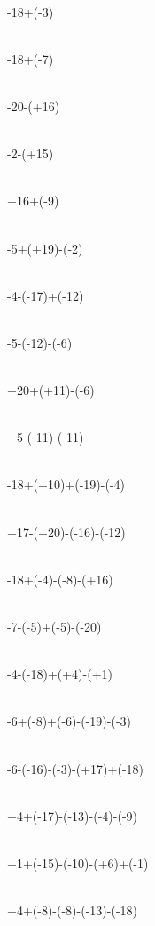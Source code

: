 
\begin{multicols}{4}
\\ 
-18+(-3)

\\ 
-18+(-7)

\\ 
-20-(+16)

\\ 
-2-(+15)

\\ 
+16+(-9)

\\ 
-5+(+19)-(-2)

\\ 
-4-(-17)+(-12)

\\ 
-5-(-12)-(-6)

\\ 
+20+(+11)-(-6)

\\ 
+5-(-11)-(-11)

\\ 
-18+(+10)+(-19)-(-4)

\\ 
+17-(+20)-(-16)-(-12)

\\ 
-18+(-4)-(-8)-(+16)

\\ 
-7-(-5)+(-5)-(-20)

\\ 
-4-(-18)+(+4)-(+1)

\\ 
-6+(-8)+(-6)-(-19)-(-3)

\\ 
-6-(-16)-(-3)-(+17)+(-18)

\\ 
+4+(-17)-(-13)-(-4)-(-9)

\\ 
+1+(-15)-(-10)-(+6)+(-1)

\\ 
+4+(-8)-(-8)-(-13)-(-18)

\end{multicols}